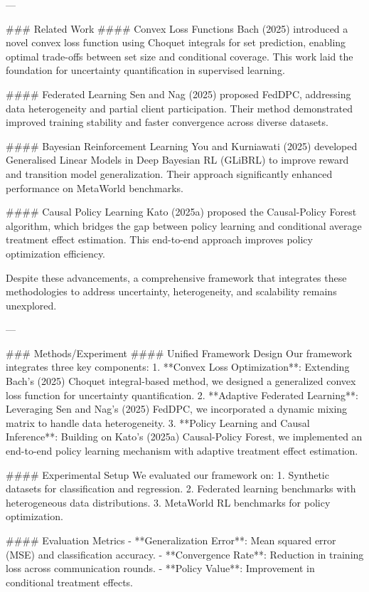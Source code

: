 ---

### Related Work
#### Convex Loss Functions
Bach (2025) introduced a novel convex loss function using Choquet integrals for set prediction, enabling optimal trade-offs between set size and conditional coverage. This work laid the foundation for uncertainty quantification in supervised learning.

#### Federated Learning
Sen and Nag (2025) proposed FedDPC, addressing data heterogeneity and partial client participation. Their method demonstrated improved training stability and faster convergence across diverse datasets.

#### Bayesian Reinforcement Learning
You and Kurniawati (2025) developed Generalised Linear Models in Deep Bayesian RL (GLiBRL) to improve reward and transition model generalization. Their approach significantly enhanced performance on MetaWorld benchmarks.

#### Causal Policy Learning
Kato (2025a) proposed the Causal-Policy Forest algorithm, which bridges the gap between policy learning and conditional average treatment effect estimation. This end-to-end approach improves policy optimization efficiency.

Despite these advancements, a comprehensive framework that integrates these methodologies to address uncertainty, heterogeneity, and scalability remains unexplored.

---

### Methods/Experiment
#### Unified Framework Design
Our framework integrates three key components:
1. **Convex Loss Optimization**: Extending Bach's (2025) Choquet integral-based method, we designed a generalized convex loss function for uncertainty quantification.
2. **Adaptive Federated Learning**: Leveraging Sen and Nag's (2025) FedDPC, we incorporated a dynamic mixing matrix to handle data heterogeneity.
3. **Policy Learning and Causal Inference**: Building on Kato's (2025a) Causal-Policy Forest, we implemented an end-to-end policy learning mechanism with adaptive treatment effect estimation.

#### Experimental Setup
We evaluated our framework on:
1. Synthetic datasets for classification and regression.
2. Federated learning benchmarks with heterogeneous data distributions.
3. MetaWorld RL benchmarks for policy optimization.

#### Evaluation Metrics
- **Generalization Error**: Mean squared error (MSE) and classification accuracy.
- **Convergence Rate**: Reduction in training loss across communication rounds.
- **Policy Value**: Improvement in conditional treatment effects.

